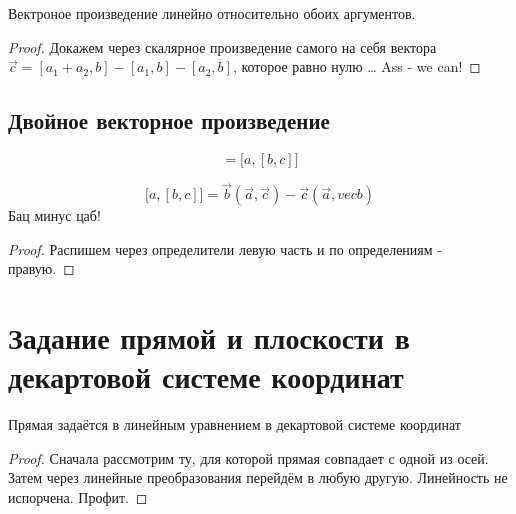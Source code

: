 \documentclass[12pt, a4paper]{article}
\begin{document}
    \begin{theorem}
        Вектроное произведение линейно относительно обоих аргументов.
    \end{theorem}
    \begin{proof}
        Докажем через скалярное произведение самого на себя вектора $\vec{c} = [a_1 + a_2, b] - [a_1, b] - [a_2, b]$, которое равно нулю \dots 
        Ass - we can!    
    \end{proof}
    

    \subsection{Двойное векторное произведение}
    
    \begin{definition}
        \begin{equation}
            [a, b, c] = \bigl[a, [b, c]\bigr]    
        \end{equation}
    \end{definition}

    \begin{theorem}
        \begin{equation}
            \bigl[a, [b, c]\bigr] = \vec{b}(\vec{a}, \vec{c}) - \vec{c}(\vec{a}, vec{b})
        \end{equation}
        Бац минус цаб!
    \end{theorem}
    \begin{proof}
        Распишем через определители левую часть и по определениям - правую.
    \end{proof}





    \section{Задание прямой и плоскости в декартовой системе координат}

    \begin{theorem}
        Прямая задаётся в линейным уравнением в декартовой системе координат
    \end{theorem}
    \begin{proof}
        Сначала рассмотрим ту, для которой прямая совпадает с одной из осей.
        Затем через линейные преобразования перейдём в любую другую. 
        Линейность не испорчена. Профит. 
    \end{proof}
\end{document}
